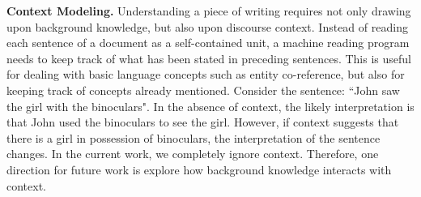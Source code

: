\documentclass[jair,twoside,11pt,theapa]{article}
\renewcommand{\paragraph}[1]{\noindent\textbf{#1.}}
\begin{document}
\paragraph{Context Modeling} 
Understanding a piece of writing requires not only drawing upon background knowledge, but also upon discourse context.
Instead of reading each sentence of a document as a self-contained unit,  a machine reading program  needs to keep track of what has been stated in preceding sentences.  This is useful for dealing with  basic language concepts such as entity co-reference, but also for keeping track of  concepts already mentioned. Consider the sentence: ``John saw the girl with the binoculars". In the absence of context, the likely interpretation is that John used the binoculars to see the girl. However, if context suggests that there is a girl in possession of binoculars, the interpretation of the sentence changes. In the current work, we completely ignore context. Therefore, one direction for future work is explore how background knowledge interacts with context.








\vskip 0.2in
\nocite{*}


%
\end{document}
